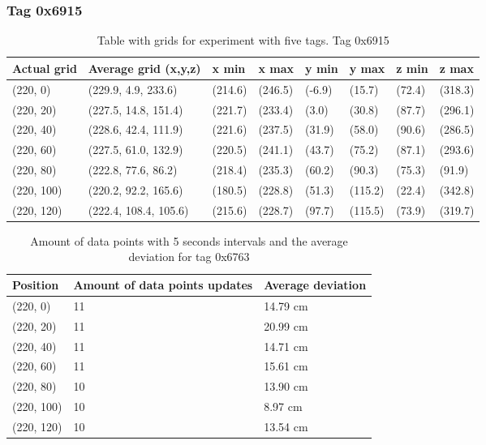 \subsubsection{Tag 0x6915}
\begin{table}[H]
    \centering
    \begin{tabular}{|l|l|l|l|l|l|l|l|}
        \hline
        Actual grid & Average grid (x,y,z)  & x min   & x max   & y min  & y max   & z min  & z max   \\ \hline
        (220, 0)    & (229.9, 4.9, 233.6)   & (214.6) & (246.5) & (-6.9) & (15.7)  & (72.4) & (318.3) \\ \hline
        (220, 20)   & (227.5, 14.8, 151.4)  & (221.7) & (233.4) & (3.0)  & (30.8)  & (87.7) & (296.1) \\ \hline
        (220, 40)   & (228.6, 42.4, 111.9)  & (221.6) & (237.5) & (31.9) & (58.0)  & (90.6) & (286.5) \\ \hline
        (220, 60)   & (227.5, 61.0, 132.9)  & (220.5) & (241.1) & (43.7) & (75.2)  & (87.1) & (293.6) \\ \hline
        (220, 80)   & (222.8, 77.6, 86.2)   & (218.4) & (235.3) & (60.2) & (90.3)  & (75.3) & (91.9)  \\ \hline
        (220, 100)  & (220.2, 92.2, 165.6)  & (180.5) & (228.8) & (51.3) & (115.2) & (22.4) & (342.8) \\ \hline
        (220, 120)  & (222.4, 108.4, 105.6) & (215.6) & (228.7) & (97.7) & (115.5) & (73.9) & (319.7) \\ \hline
    \end{tabular}
    \caption{Table with grids for experiment with five tags. Tag 0x6915}
\end{table}

\begin{table}[H]
    \centering
    \begin{tabular}{|l|l|l|}
        \hline
        Position   & Amount of data points updates & Average deviation \\ \hline
        (220, 0)   & 11                            & 14.79 cm          \\ \hline
        (220, 20)  & 11                            & 20.99 cm          \\ \hline
        (220, 40)  & 11                            & 14.71 cm          \\ \hline
        (220, 60)  & 11                            & 15.61 cm          \\ \hline
        (220, 80)  & 10                            & 13.90 cm          \\ \hline
        (220, 100) & 10                            & 8.97 cm           \\ \hline
        (220, 120) & 10                            & 13.54 cm          \\ \hline
    \end{tabular}
    \caption{Amount of data points with 5 seconds intervals and the average deviation for tag 0x6763}
\end{table}

